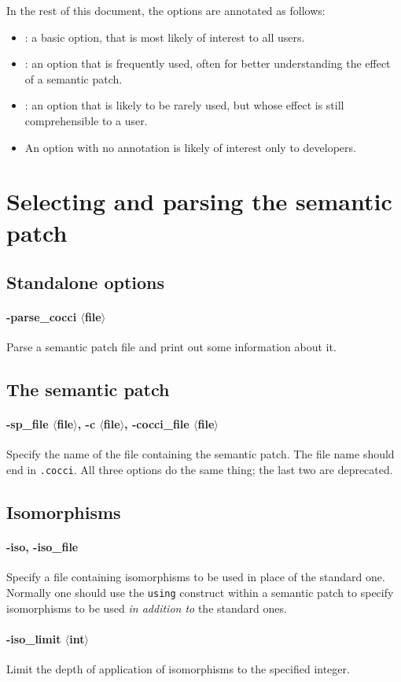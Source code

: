 \documentclass{article}
\newcommand{\minimum}[2]{\paragraph*{\makebox[0in][r]{\FilledBigDiamondshape\,\,} {{#1}}} {#2}}
\newcommand{\normal}[2]{\paragraph*{\makebox[0in][r]{\BigLowerDiamond\,\,} {{#1}}} {#2}}
\newcommand{\rare}[2]{\paragraph*{\makebox[0in][r]{\BigDiamondshape\,\,} {{#1}}} {#2}}
\begin{document}
In the rest of this document, the options are annotated as follows:
\begin{itemize}
\item \FilledBigDiamondshape: a basic option, that is most likely of
  interest to all users.
\item \BigLowerDiamond: an option that is frequently used, often for better
understanding the effect of a semantic patch.
\item \BigDiamondshape: an option that is likely to be rarely used, but
  whose effect is still comprehensible to a user.
\item An option with no annotation is likely of interest only to
  developers.
\end{itemize}

\section{Selecting and parsing the semantic patch}

\subsection{Standalone options}

\normal{-parse\_cocci $\langle$file$\rangle$}{ Parse a semantic
patch file and print out some information about it.}

\subsection{The semantic patch}

\minimum{-sp\_file $\langle$file$\rangle$, -c $\langle$file$\rangle$, 
-cocci\_file $\langle$file$\rangle$}{ Specify the name of the file
  containing the semantic patch.  The file name should end in {\tt .cocci}.
All three options do the same thing; the last two are deprecated.}

\subsection{Isomorphisms}

\rare{-iso, -iso\_file}{ Specify a file containing isomorphisms to be used in
place of the standard one.  Normally one should use the {\tt using}
construct within a semantic patch to specify isomorphisms to be used {\em
  in addition to} the standard ones.}

\rare{-iso\_limit $\langle$int$\rangle$} Limit the depth of application of
isomorphisms to the specified integer.
\end{document}
